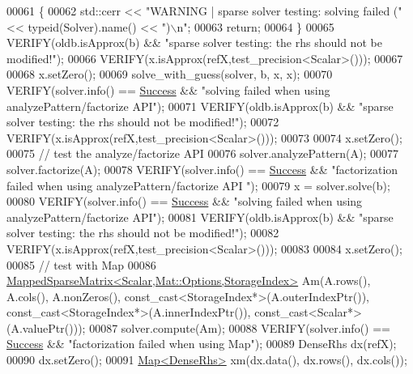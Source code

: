 \begin{DoxyCode}
00061     \{
00062       std::cerr << \textcolor{stringliteral}{"WARNING | sparse solver testing: solving failed ("} << \textcolor{keyword}{typeid}(Solver).name() << \textcolor{stringliteral}{")\(\backslash\)n"};
00063       \textcolor{keywordflow}{return};
00064     \}
00065     VERIFY(oldb.isApprox(b) && \textcolor{stringliteral}{"sparse solver testing: the rhs should not be modified!"});
00066     VERIFY(x.isApprox(refX,test\_precision<Scalar>()));
00067 
00068     x.setZero();
00069     solve\_with\_guess(solver, b, x, x);
00070     VERIFY(solver.info() == \hyperlink{group__enums_gga85fad7b87587764e5cf6b513a9e0ee5ea52581b035f4b59c203b8ff999ef5fcea}{Success} && \textcolor{stringliteral}{"solving failed when using analyzePattern/factorize API"});
00071     VERIFY(oldb.isApprox(b) && \textcolor{stringliteral}{"sparse solver testing: the rhs should not be modified!"});
00072     VERIFY(x.isApprox(refX,test\_precision<Scalar>()));
00073     
00074     x.setZero();
00075     \textcolor{comment}{// test the analyze/factorize API}
00076     solver.analyzePattern(A);
00077     solver.factorize(A);
00078     VERIFY(solver.info() == \hyperlink{group__enums_gga85fad7b87587764e5cf6b513a9e0ee5ea52581b035f4b59c203b8ff999ef5fcea}{Success} && \textcolor{stringliteral}{"factorization failed when using analyzePattern/factorize API
      "});
00079     x = solver.solve(b);
00080     VERIFY(solver.info() == \hyperlink{group__enums_gga85fad7b87587764e5cf6b513a9e0ee5ea52581b035f4b59c203b8ff999ef5fcea}{Success} && \textcolor{stringliteral}{"solving failed when using analyzePattern/factorize API"});
00081     VERIFY(oldb.isApprox(b) && \textcolor{stringliteral}{"sparse solver testing: the rhs should not be modified!"});
00082     VERIFY(x.isApprox(refX,test\_precision<Scalar>()));
00083     
00084     x.setZero();
00085     \textcolor{comment}{// test with Map}
00086     \hyperlink{class_eigen_1_1_mapped_sparse_matrix}{MappedSparseMatrix<Scalar,Mat::Options,StorageIndex>}
       Am(A.rows(), A.cols(), A.nonZeros(), \textcolor{keyword}{const\_cast<}StorageIndex*\textcolor{keyword}{>}(A.outerIndexPtr()), 
      const\_cast<StorageIndex*>(A.innerIndexPtr()), const\_cast<Scalar*>(A.valuePtr()));
00087     solver.compute(Am);
00088     VERIFY(solver.info() == \hyperlink{group__enums_gga85fad7b87587764e5cf6b513a9e0ee5ea52581b035f4b59c203b8ff999ef5fcea}{Success} && \textcolor{stringliteral}{"factorization failed when using Map"});
00089     DenseRhs dx(refX);
00090     dx.setZero();
00091     \hyperlink{group___core___module_class_eigen_1_1_map}{Map<DenseRhs>} xm(dx.data(), dx.rows(), dx.cols());

\end{DoxyCode}
